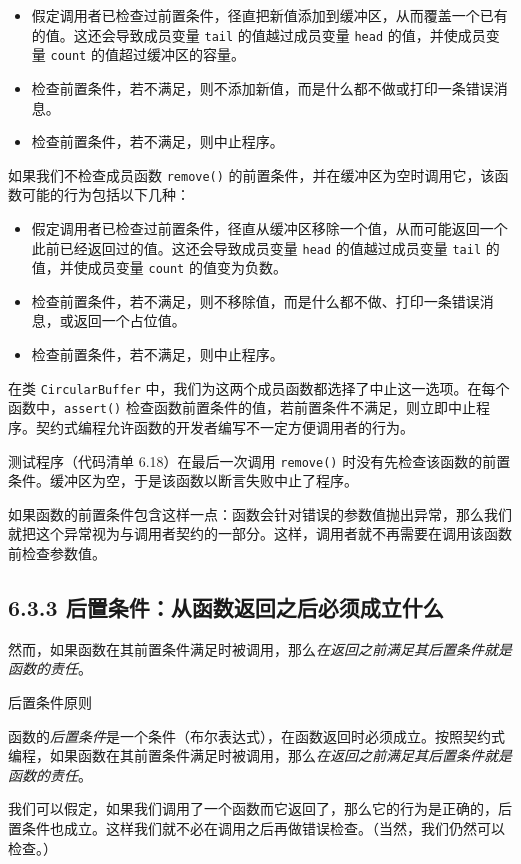 \begin{itemize}
\item 假定调用者已检查过前置条件，径直把新值添加到缓冲区，从而覆盖一个已有的值。这还会导致成员变量 \texttt{tail} 的值越过成员变量 \texttt{head} 的值，并使成员变量 \texttt{count} 的值超过缓冲区的容量。
\item 检查前置条件，若不满足，则不添加新值，而是什么都不做或打印一条错误消息。
\item 检查前置条件，若不满足，则中止程序。
\end{itemize}

如果我们不检查成员函数 \texttt{remove()} 的前置条件，并在缓冲区为空时调用它，该函数可能的行为包括以下几种：

\begin{itemize}
\item 假定调用者已检查过前置条件，径直从缓冲区移除一个值，从而可能返回一个此前已经返回过的值。这还会导致成员变量 \texttt{head} 的值越过成员变量 \texttt{tail} 的值，并使成员变量 \texttt{count} 的值变为负数。
\item 检查前置条件，若不满足，则不移除值，而是什么都不做、打印一条错误消息，或返回一个占位值。
\item 检查前置条件，若不满足，则中止程序。
\end{itemize}

在类 \texttt{Circular\allowbreak{}Buffer} 中，我们为这两个成员函数都选择了中止这一选项。在每个函数中，\texttt{assert()} 检查函数前置条件的值，若前置条件不满足，则立即中止程序。契约式编程允许函数的开发者编写不一定方便调用者的行为。

测试程序（代码清单 6.18）在最后一次调用 \texttt{remove()} 时没有先检查该函数的前置条件。缓冲区为空，于是该函数以断言失败中止了程序。


如果函数的前置条件包含这样一点：函数会针对错误的参数值抛出异常，那么我们就把这个异常视为与调用者契约的一部分。这样，调用者就不再需要在调用该函数前检查参数值。

\subsection{6.3.3 后置条件：从函数返回之后必须成立什么}

然而，如果函数在其前置条件满足时被调用，那么\emph{在返回之前满足其后置条件就是函数的责任}。

\begin{mySidebar}{后置条件原则}

函数的\emph{后置条件}是一个条件（布尔表达式），在函数返回时必须成立。按照契约式编程，如果函数在其前置条件满足时被调用，那么\emph{在返回之前满足其后置条件就是函数的责任}。

我们可以假定，如果我们调用了一个函数而它返回了，那么它的行为是正确的，后置条件也成立。这样我们就不必在调用之后再做错误检查。（当然，我们仍然可以检查。）
\end{mySidebar}

